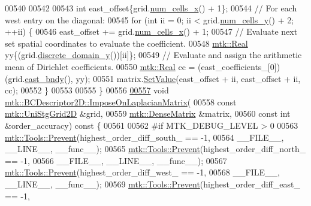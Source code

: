 \begin{DoxyCode}
00540 
00542 
00543   \textcolor{keywordtype}{int} east\_offset\{grid.\hyperlink{classmtk_1_1UniStgGrid2D_a2d182866a398aba8e4829590e85bf939}{num\_cells\_x}() + 1\};
00544   \textcolor{comment}{// For each west entry on the diagonal:}
00545   \textcolor{keywordflow}{for} (\textcolor{keywordtype}{int} ii = 0; ii < grid.\hyperlink{classmtk_1_1UniStgGrid2D_aed05a801cc9a76dba0ff203cea58a61a}{num\_cells\_y}() + 2; ++ii) \{
00546     east\_offset += grid.\hyperlink{classmtk_1_1UniStgGrid2D_a2d182866a398aba8e4829590e85bf939}{num\_cells\_x}() + 1;
00547     \textcolor{comment}{// Evaluate next set spatial coordinates to evaluate the coefficient.}
00548     \hyperlink{group__c01-roots_gac080bbbf5cbb5502c9f00405f894857d}{mtk::Real} yy\{(grid.\hyperlink{classmtk_1_1UniStgGrid2D_ac33a58d65105550dcf6f6b92b48b5105}{discrete\_domain\_y}())[ii]\};
00549     \textcolor{comment}{// Evaluate and assign the arithmetic mean of Dirichlet coefficients.}
00550     \hyperlink{group__c01-roots_gac080bbbf5cbb5502c9f00405f894857d}{mtk::Real} cc = (east\_coefficients\_[0])(grid.\hyperlink{classmtk_1_1UniStgGrid2D_a03f689eb29a6369b82ce1207c655d5ff}{east\_bndy}(), yy);
00551     matrix.\hyperlink{classmtk_1_1DenseMatrix_a784ce5784109ac86bfb9d8562b334b13}{SetValue}(east\_offset + ii, east\_offset + ii, cc);
00552   \}
00553 
00555 \}
00556 
\hypertarget{mtk__bc__descriptor__2d_8cc_source_l00557}{}\hyperlink{classmtk_1_1BCDescriptor2D_a35592617dda3b965b680b2a1355122f4}{00557} \textcolor{keywordtype}{void} \hyperlink{classmtk_1_1BCDescriptor2D_a35592617dda3b965b680b2a1355122f4}{mtk::BCDescriptor2D::ImposeOnLaplacianMatrix}(
00558     \textcolor{keyword}{const} \hyperlink{classmtk_1_1UniStgGrid2D}{mtk::UniStgGrid2D} &grid,
00559     \hyperlink{classmtk_1_1DenseMatrix}{mtk::DenseMatrix} &matrix,
00560     \textcolor{keyword}{const} \textcolor{keywordtype}{int} &order\_accuracy)\textcolor{keyword}{ const }\{
00561 
00562 \textcolor{preprocessor}{  #if MTK\_DEBUG\_LEVEL > 0}
00563   \hyperlink{classmtk_1_1Tools_a332324c6f25e66be9dff48c5987a3b9f}{mtk::Tools::Prevent}(highest\_order\_diff\_south\_ == -1,
00564                       \_\_FILE\_\_, \_\_LINE\_\_, \_\_func\_\_);
00565   \hyperlink{classmtk_1_1Tools_a332324c6f25e66be9dff48c5987a3b9f}{mtk::Tools::Prevent}(highest\_order\_diff\_north\_ == -1,
00566                       \_\_FILE\_\_, \_\_LINE\_\_, \_\_func\_\_);
00567   \hyperlink{classmtk_1_1Tools_a332324c6f25e66be9dff48c5987a3b9f}{mtk::Tools::Prevent}(highest\_order\_diff\_west\_ == -1,
00568                       \_\_FILE\_\_, \_\_LINE\_\_, \_\_func\_\_);
00569   \hyperlink{classmtk_1_1Tools_a332324c6f25e66be9dff48c5987a3b9f}{mtk::Tools::Prevent}(highest\_order\_diff\_east\_ == -1,

\end{DoxyCode}
